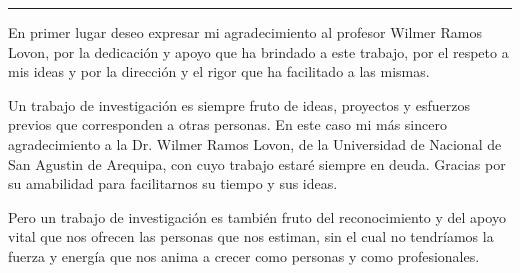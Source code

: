 \begin{acknowledgements}
\hrule \bigskip \vspace*{1cm}
En primer lugar deseo expresar mi agradecimiento al profesor Wilmer Ramos Lovon, por la dedicación y apoyo  que ha brindado a este trabajo, por el respeto a mis  ideas y por la dirección y el rigor que ha facilitado a las
mismas.

Un trabajo de investigación es siempre fruto de ideas, proyectos y esfuerzos previos que
corresponden a otras personas. En este caso mi más sincero agradecimiento a la Dr.
Wilmer Ramos Lovon, de la Universidad de Nacional de San Agustin de Arequipa, con cuyo trabajo estaré siempre en deuda. Gracias por su amabilidad para facilitarnos su tiempo y sus ideas.

Pero un trabajo de investigación es también fruto del reconocimiento y del apoyo vital
que nos ofrecen las personas que nos estiman, sin el cual no tendríamos la fuerza y
energía que nos anima a crecer como personas y como profesionales.

\end{acknowledgements}
